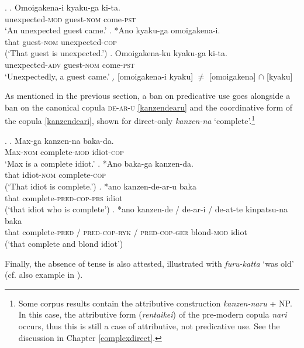 \documentclass [output=book,colorlinks,citecolor=brown]{langscibook}
\begin{document}

\ex. \ag. Omoigakena-i kyaku-ga ki-ta.\\
unexpected-\textsc{mod} guest-\textsc{nom} come-\textsc{pst}\\
`An unexpected guest came.' \null \hfill \citep[67]{yamakido:2005:nature}
\bg. *Ano kyaku-ga omoigakena-i.\\
that guest-\textsc{nom} unexpected-\textsc{cop}\\
(`That guest is unexpected.’)
\cg. Omoigakena-ku kyaku-ga ki-ta.\\
unexpected-\textsc{adv} guest-\textsc{nom} come-\textsc{pst}\\
`Unexpectedly, a guest came.'
\d. [omoigakena-i kyaku] $\neq$ [omoigakena] $\cap$ [kyaku]

As mentioned in the previous section, a ban on predicative use goes alongside a ban on the canonical copula \textsc{de-ar-u} \ref{kanzendearu} \citep[108-109]{ayano:2010:revisiting} and the coordinative form of the copula \ref{kanzendeari}, shown for direct-only \textit{kanzen-na} `complete’.\footnote{Some corpus results contain the attributive construction \textit{kanzen-naru} + NP. In this case, the attributive form (\textit{rentaikei}) of the pre-modern copula \textit{nari} occurs, thus this is still a case of attributive, not predicative use. See the discussion in Chapter \ref{complexdirect}.}


\ex. \ag. Max-ga kanzen-na baka-da.\\
Max-\textsc{nom} complete-\textsc{mod} idiot-\textsc{cop}\\
`Max is a complete idiot.' \null \hfill \citep[68]{yamakido:2005:nature}
\bg. *Ano baka-ga kanzen-da.\\
that idiot-\textsc{nom} complete-\textsc{cop}\\
(`That idiot is complete.’)
\cg. *ano kanzen-de-ar-u baka\\
that complete-\textsc{pred-cop-prs} idiot \label{kanzendearu}\\
(`that idiot who is complete’)
\dg. *ano kanzen-de / de-ar-i / de-at-te kinpatsu-na baka\\
that complete-\textsc{pred} / \textsc{pred-cop-ryk} / \textsc{pred-cop-ger} blond-\textsc{mod} idiot \label{kanzendeari}\\
(`that complete and blond idiot’)

Finally, the absence of tense is also attested, illustrated with \textit{furu-katta} `was old' (cf. also example in \citealt[109]{ayano:2010:revisiting}).
\end{document}
